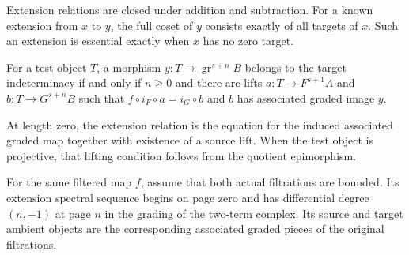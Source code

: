 \begin{theorem}
\label{sem:SpectralSequence:extension-coset}
Extension relations are closed under addition and subtraction. For a known extension from $x$ to $y$, the full coset of $y$ consists exactly of all targets of $x$. Such an extension is essential exactly when $x$ has no zero target.
\end{theorem}

\begin{theorem}
\label{sem:SpectralSequence:higher-filtration}
For a test object $T$, a morphism $y:T\to\operatorname{gr}^{s+n}B$ belongs to the target indeterminacy if and only if $n\geq0$ and there are lifts $a:T\to F^{s+1}A$ and $b:T\to G^{s+n}B$ such that $f\circ i_F\circ a=i_G\circ b$ and $b$ has associated graded image $y$.
\end{theorem}

\begin{theorem}
\label{sem:SpectralSequence:length-zero}
At length zero, the extension relation is the equation for the induced associated graded map together with existence of a source lift. When the test object is projective, that lifting condition follows from the quotient epimorphism.
\end{theorem}

\begin{definition}
\label{sem:SpectralSequence:bounded-ess}
For the same filtered map $f$, assume that both actual filtrations are bounded. Its extension spectral sequence begins on page zero and has differential degree $(n,-1)$ at page $n$ in the grading of the two-term complex. Its source and target ambient objects are the corresponding associated graded pieces of the original filtrations.
\end{definition}

